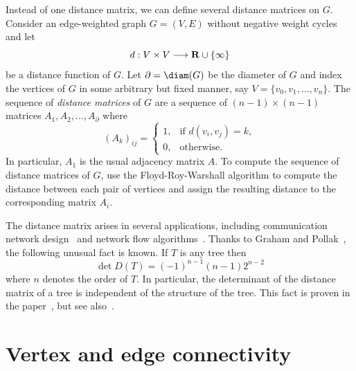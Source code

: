 Instead of one distance matrix, we can define several distance
matrices on $G$. Consider an edge-weighted graph $G = (V,E)$ without
negative weight cycles and let
\[
d: V \times V \longrightarrow \mathbf{R} \cup \{\infty\}
\]
be a distance function of $G$. Let $\partial = \diam(G)$ be the
diameter of $G$ and index the vertices of $G$ in some arbitrary but
fixed manner, say $V = \{v_0, v_1, \dots, v_n\}$. The sequence of
\emph{distance matrices} of $G$ are a sequence
of $(n - 1) \times (n - 1)$ matrices $A_1, A_2, \dots, A_\partial$ where
\[
(A_k)_{ij}
=
\begin{cases}
1, & \text{if $d(v_i, v_j) = k$}, \\[4pt]
0, & \text{otherwise}.
\end{cases}
\]
In particular, $A_1$ is the usual adjacency matrix $A$. To compute the
sequence of distance matrices of $G$, use the
Floyd-Roy-Warshall algorithm to
compute the distance between each pair of vertices and assign the
resulting distance to the corresponding matrix $A_i$.

The distance matrix arises in several applications, including
communication network design~\cite{GrahamPollak1971} and network flow
algorithms~\cite{Dijkstra1959}. Thanks to
Graham and
Pollak~\cite{GrahamPollak1971}, the following
unusual fact is known. If $T$ is any tree then
\[
\det D(T)
=
(-1)^{n - 1} (n - 1) 2^{n - 2}
\]
where $n$ denotes the order of $T$. In particular, the determinant of
the distance matrix of a tree is independent of the structure of the
tree.  This fact is proven in the paper~\cite{GrahamPollak1971}, but
see also~\cite{EdelbergEtAl1976}.



\section{Vertex and edge connectivity}


